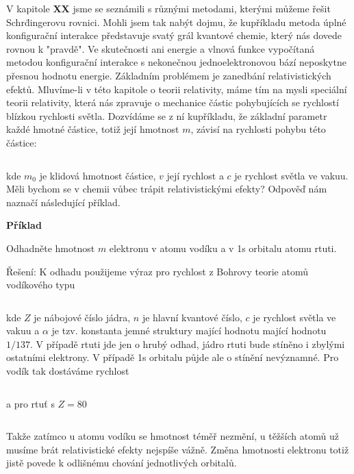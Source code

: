 V kapitole \textbf{XX} jsme se seznámili s různými metodami, kterými můžeme řešit Schr\"dingerovu rovnici. Mohli jsem tak nabýt dojmu, že kupříkladu metoda úplné konfigurační interakce představuje svatý grál kvantové chemie, který nás dovede rovnou k "pravdě". Ve skutečnosti ani energie a vlnová funkce vypočítaná metodou konfigurační interakce s nekonečnou jednoelektronovou bází neposkytne přesnou hodnotu energie. Základním problémem je zanedbání relativistických efektů. Mluvíme-li v této kapitole o teorii relativity, máme tím na mysli speciální teorii relativity, která nás zpravuje o mechanice částic pohybujících se rychlostí blízkou rychlosti světla. Dozvídáme se z ní kupříkladu, že základní parametr každé hmotné částice, totiž její hmotnost $m$, závisí na rychlosti pohybu této částice:

\begin{equation}
\label{rov:XXX}
\end{equation}

\noindent kde $m_0$ je klidová hmotnost částice, $v$ její rychlost a  $c$ je rychlost světla ve vakuu. Měli bychom se v chemii vůbec trápit relativistickými efekty? Odpověď nám naznačí následující příklad.

\textbf{Příklad}

Odhadněte hmotnost $m$ elektronu v atomu vodíku a v 1s orbitalu atomu rtuti.

Řešení: K odhadu použijeme výraz pro rychlost z Bohrovy teorie atomů vodíkového typu

\begin{equation}
\label{rov:XXX}
\end{equation}

\noindent kde $Z$ je nábojové číslo jádra, $n$ je hlavní kvantové číslo, $c$ je rychlost světla ve vakuu a $\alpha$ je tzv. konstanta jemné struktury mající hodnotu mající hodnotu $1/137$. V případě rtuti jde jen o hrubý odhad, jádro rtuti bude stíněno i zbylými ostatními elektrony. V případě 1s orbitalu půjde ale o stínění nevýznamné. Pro vodík tak dostáváme rychlost

\begin{equation}
\label{rov:XXX}
\end{equation}

\noindent a pro rtuť s $Z=80$

\begin{equation}
\label{rov:XXX}
\end{equation}

\noindent Takže zatímco u atomu vodíku se hmotnost téměř nezmění, u těžších atomů už musíme brát relativistické efekty nejspíše vážně. Změna hmotnosti elektronu totiž jistě povede k odlišnému chování jednotlivých orbitalů.

